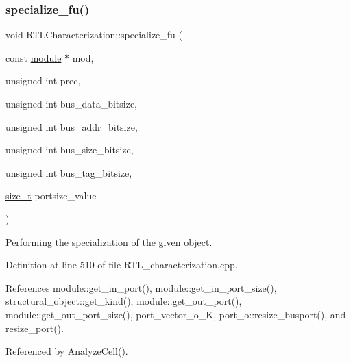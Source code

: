 \subsubsection{\texorpdfstring{specialize\+\_\+fu()}{specialize\_fu()}}
{\footnotesize\ttfamily void R\+T\+L\+Characterization\+::specialize\+\_\+fu (\begin{DoxyParamCaption}\item[{const \hyperlink{classmodule}{module} $\ast$}]{mod,  }\item[{unsigned int}]{prec,  }\item[{unsigned int}]{bus\+\_\+data\+\_\+bitsize,  }\item[{unsigned int}]{bus\+\_\+addr\+\_\+bitsize,  }\item[{unsigned int}]{bus\+\_\+size\+\_\+bitsize,  }\item[{unsigned int}]{bus\+\_\+tag\+\_\+bitsize,  }\item[{\hyperlink{tutorial__fpt__2017_2intro_2sixth_2test_8c_a7c94ea6f8948649f8d181ae55911eeaf}{size\+\_\+t}}]{portsize\+\_\+value }\end{DoxyParamCaption})\hspace{0.3cm}{\ttfamily [private]}}



Performing the specialization of the given object. 



Definition at line 510 of file R\+T\+L\+\_\+characterization.\+cpp.



References module\+::get\+\_\+in\+\_\+port(), module\+::get\+\_\+in\+\_\+port\+\_\+size(), structural\+\_\+object\+::get\+\_\+kind(), module\+::get\+\_\+out\+\_\+port(), module\+::get\+\_\+out\+\_\+port\+\_\+size(), port\+\_\+vector\+\_\+o\+\_\+K, port\+\_\+o\+::resize\+\_\+busport(), and resize\+\_\+port().



Referenced by Analyze\+Cell().

